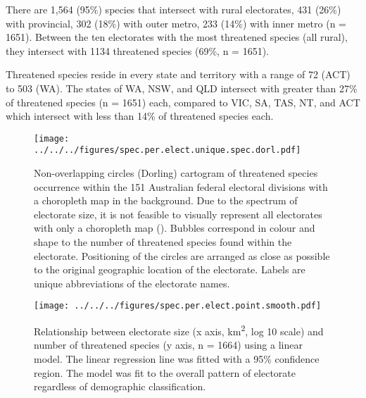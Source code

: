 \documentclass[a4paper,11pt]{article}
\begin{document}
There are 1,564 (95\%) species that intersect with rural electorates, 431 (26\%) with provincial, 302 (18\%) with outer metro, 233 (14\%) with inner metro (n = 1651). Between the ten electorates with the most threatened species (all rural), they intersect with 1134 threatened species (69\%, n = 1651).

Threatened species reside in every state and territory with a range of 72 (ACT) to 503 (WA). The states of WA, NSW, and QLD intersect with greater than 27\% of threatened species (n = 1651) each, compared to VIC, SA, TAS, NT, and ACT which intersect with less than 14\% of threatened species each.


\begin{figure}[H]
	\centering
    \texttt{[image: ../../../figures/spec.per.elect.unique.spec.dorl.pdf]}
    \caption{Non-overlapping circles (Dorling) cartogram of threatened species occurrence within the 151 Australian federal electoral divisions with a choropleth map in the background. Due to the spectrum of electorate size, it is not feasible to visually represent all electorates with only a choropleth map (\cite{tomasettiMappingAustraliaElectorates2021}). Bubbles correspond in colour and shape to the number of threatened species found within the electorate. Positioning of the circles are arranged as close as possible to the original geographic location of the electorate. Labels are unique abbreviations of the electorate names.}
    \label{fig:dorl}
\end{figure}


\begin{figure}[H]
	\centering
    \texttt{[image: ../../../figures/spec.per.elect.point.smooth.pdf]}
    \caption{Relationship between electorate size (x axis, km\textsuperscript{2}, log 10 scale) and number of threatened species (y axis, n = 1664) using a linear model. The linear regression line was fitted with a 95\% confidence region. The model was fit to the overall pattern of electorate regardless of demographic classification.}
    \label{fig:point_smooth}
\end{figure}
\end{document}
